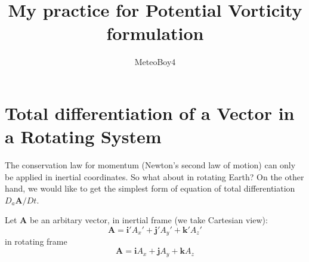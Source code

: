 \documentclass[12pt]{article}
\numberwithin{equation}{section}
\begin{document}
\title{My practice for Potential Vorticity formulation}
\author{MeteoBoy4}
\maketitle

\section{Total differentiation of a Vector in a Rotating System}

The conservation law for momentum (Newton's second law of motion) can only be applied in inertial coordinates.
So what about in rotating Earth?
On the other hand, we would like to get the simplest form of equation of total differentiation $D_{a}\bm{A}/Dt$.

Let $\bm{A}$ be an arbitary vector, in inertial frame (we take Cartesian view):
\begin{equation}
    \bm{A} = \bm{i}'A_{x}'+\bm{j}'A_{y}'+\bm{k}'A_{z}'
\end{equation}
in rotating frame
\begin{equation}
    \bm{A} = \bm{i}A_x+\bm{j}A_y+\bm{k}A_z
\end{equation}
\end{document}
